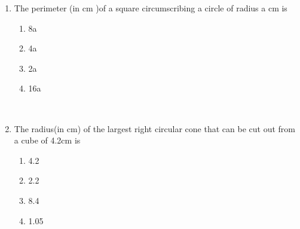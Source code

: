 \documentclass[journal,12pt,twocolumn]{IEEEtran}
\renewcommand\thesection{\arabic{section}}
\begin{document}
\begin{enumerate}[label=\thesection.\arabic*.,ref=\thesection.\theenumi]



\item The perimeter (in cm )of a square circumscribing a circle of radius a cm is
\begin{enumerate}
    \item 8a
    \item 4a
    \item 2a
    \item 16a
\end{enumerate}


$
$
$
$
$
$
$
$
\item The radius(in cm) of the largest right circular cone that can be cut out from a cube of 4.2cm is
\begin{enumerate}
    \item 4.2
    \item 2.2
    \item 8.4
    \item 1.05
\end{enumerate}


\end{enumerate}
\end{document}

